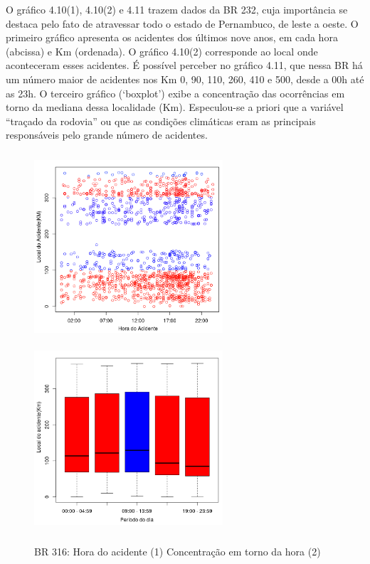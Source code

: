 O gráfico 4.10(1), 4.10(2)  e 4.11 trazem dados da BR 232, cuja importância se destaca pelo fato de atravessar todo o estado de Pernambuco, de leste a oeste. O primeiro gráfico apresenta os acidentes dos últimos nove anos, em cada hora (abcissa) e Km (ordenada). O  gráfico 4.10(2) corresponde ao local onde aconteceram esses acidentes. É possível perceber no gráfico 4.11, que nessa BR há um número maior de acidentes nos Km 0, 90, 110, 260, 410 e 500, desde a 00h até as 23h. O terceiro gráfico (‘boxplot’) exibe a concentração das ocorrências em torno da mediana dessa localidade (Km). 
Especulou-se a priori que a variável “traçado da rodovia” ou que as condições climáticas eram as principais responsáveis pelo grande número de acidentes.



\pagebreak

\begin{figure}[h]
	\caption{BR 316: Hora do acidente (1) Concentração em torno da hora (2)}
	\includegraphics[width=7cm,height=7cm]{Figuras/Preprocess/br316_1.png}
	\includegraphics[width=7cm,height=7cm]{Figuras/Preprocess/br316_2.png}

\end{figure}

